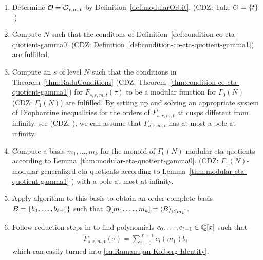 \documentclass{article}
\begin{document}
\begin{enumerate}
\item Determine $\mathcal{O}=\modularOrbit{r,m,t}$ by
  Definition~\ref{def:modularOrbit}.
  (CDZ: Take $\mathcal{O}=\Set{t}$.)

\item Compute $N$ such that the conditons of
  Definition~\ref{def:condition-co-eta-quotient-gamma0}
  (CDZ: Definition~\ref{def:condition-co-eta-quotient-gamma1})
  are fulfilled.

\item Compute an  $s$ of level $N$ such
  that the conditions in Theorem~\ref{thm:RaduConditions}
  (CDZ: Theorem~\ref{thm:condition-co-eta-quotient-gamma1})
  for $F_{s,r,m,t}(\tau)$ to be a modular function for $\Gamma_0(N)$
  (CDZ: $\Gamma_1(N)$)
  are fulfilled. By setting up and solving an appropriate system of
  Diophantine inequalities for the orders of $F_{s,r,m,t}$ at cusps
  different from infinity, see
  \cite[Proposition~3.2.8]{Ligozat_CourbesModulaires_1975} (CDZ:
  \cite[Thm.~4]{Robins_GeneralizedDedekindEtaProducts_1994}), we can
  assume that $F_{s,r,m,t}$ has at most a pole at infinity.
\item Compute a basis $m_1,\ldots, m_k$ for the monoid of
  $\Gamma_0(N)$-modular eta-quotients according
  to Lemma~\ref{thm:modular-eta-quotient-gamma0}.
  (CDZ: $\Gamma_1(N)$-modular generalized eta-quotients according
  to Lemma~\ref{thm:modular-eta-quotient-gamma1} )
  with a pole at most at infinity.

\item Apply algorithm \algoSamba{}
  \cite{Hemmecke_DancingSambaRamanujan_2018} to this basis to obtain
  an order-complete basis $B=\Set{b_0,\ldots,b_{\ell-1}}$ such that
  $\setQ[m_1,\ldots,m_k] = \Module[{\setC[m_1]}]{B}$.

\item Follow reduction steps in
  \cite{Hemmecke_DancingSambaRamanujan_2018} to find polynomials
  $c_0,\ldots,c_{\ell-1} \in \setQ[x]$ such that
  \begin{gather*}
    F_{s,r,m,t}(\tau) = \sum_{i=0}^{\ell-1} c_i(m_1)b_i
  \end{gather*} which can easily turned into
  \eqref{eq:Ramanujan-Kolberg-Identity}.
\end{enumerate}
\end{document}
